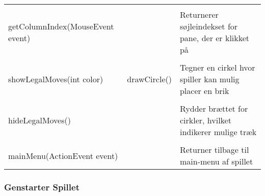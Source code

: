 \begin{table}[H]
\begin{tabular}{lll}
                                             &                 &                                                           \\
        getColumnIndex(MouseEvent event)     &                 & Returnerer søjleindekset for pane, der er klikket på      \\
                                             &                 &                                                           \\
        showLegalMoves(int color)            & drawCircle()    & Tegner en cirkel hvor spiller kan mulig placer en brik    \\
                                             &                 &                                                           \\
        hideLegalMoves()                     &                 & Rydder brættet for cirkler, hvilket indikerer mulige træk \\
                                             &                 &                                                           \\
        mainMenu(ActionEvent event)          &                 & Returner tilbage til main-menu af spillet                 \\
        \bottomrule
    \end{tabular}
\end{table}

\subsubsection{Genstarter Spillet} \label{gs}

